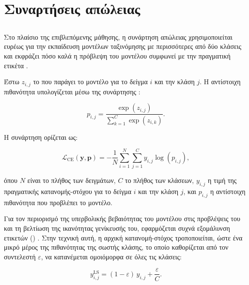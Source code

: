 \section{Συναρτήσεις απώλειας}
\label{sec:loss-functions}

\subsection{}
\label{subsec:cross-entropy}

Στο πλαίσιο της επιβλεπόμενης μάθησης, η συνάρτηση απώλειας  χρησιμοποιείται
ευρέως για την εκπαίδευση μοντέλων ταξινόμησης με περισσότερες από
δύο κλάσεις και εκφράζει πόσο καλά η πρόβλεψη του
μοντέλου συμφωνεί με την πραγματική ετικέτα \cite{bishop2006pattern}.

Έστω \(z_{i,j}\) το  που παράγει το μοντέλο για το δείγμα \(i\)
και την κλάση \(j\). Η αντίστοιχη πιθανότητα υπολογίζεται μέσω της
συνάρτησης :

\begin{equation}
    p_{i,j}
    =
    \frac{\exp(z_{i,j})}
    {\sum_{k=1}^{C}\exp(z_{i,k})}.
\end{equation}

Η συνάρτηση  ορίζεται ως:

\begin{equation}
    \mathcal{L}_{\mathrm{CE}}(\mathbf{y},\mathbf{p})
    =
    -\frac{1}{N}
    \sum_{i=1}^{N}
    \sum_{j=1}^{C}
    y_{i,j}\log(p_{i,j}),
\end{equation}

όπου \(N\) είναι το πλήθος των δειγμάτων, \(C\) το πλήθος των
κλάσεων, \(y_{i,j}\) η τιμή της πραγματικής κατανομής-στόχου για το
δείγμα \(i\) και την κλάση \(j\), και \(p_{i,j}\) η αντίστοιχη
πιθανότητα που προβλέπει το μοντέλο.

Για τον περιορισμό της υπερβολικής βεβαιότητας του μοντέλου στις
προβλέψεις του και τη βελτίωση της ικανότητας γενίκευσής του, εφαρμόζεται
συχνά εξομάλυνση ετικετών ()
\cite{szegedy2016rethinking}. Στην τεχνική αυτή, η αρχική κατανομή-στόχος τροποποιείται, ώστε ένα
μικρό μέρος της πιθανότητας της σωστής κλάσης, το οποίο καθορίζεται από
τον συντελεστή \(\varepsilon\), να κατανέμεται ομοιόμορφα σε όλες τις
κλάσεις:

\begin{equation}
    y_{i,j}^{\mathrm{LS}}
    =
    (1-\varepsilon)\,y_{i,j} + \frac{\varepsilon}{C}.
\end{equation}

